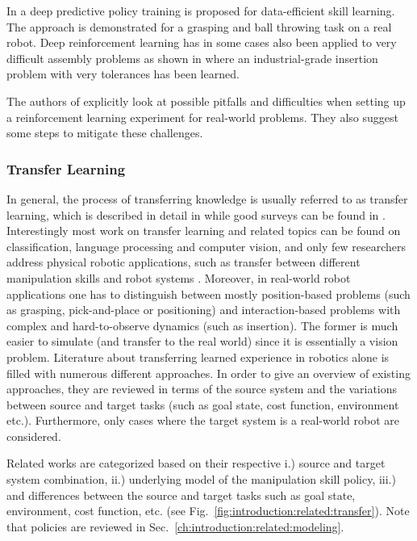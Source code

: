 In \cite{Ghadirzadeh.2017} a deep predictive policy training is proposed for data-efficient skill learning.
The approach is demonstrated for a grasping and ball throwing task on a real robot.
Deep reinforcement learning has in some cases also been applied to very difficult assembly problems as shown in \cite{Inoue.2017} where an industrial-grade insertion problem with very tolerances has been learned.

The authors of \cite{RupamMahmood.2018} explicitly look at possible pitfalls and difficulties when setting up a reinforcement learning experiment for real-world problems.
They also suggest some steps to mitigate these challenges.


\subsubsection{Transfer Learning}\label{ch:related:learning:transfer}

In general, the process of transferring knowledge is usually referred to as transfer learning, which is described in detail in \cite{Pan.2010,Weiss.2016} while good surveys can be found in \cite{Taylor.2009,Tan.2018,DaSilva.2019}.
Interestingly most work on transfer learning and related topics can be found on classification, language processing and computer vision, and only few researchers address physical robotic applications, such as transfer between different manipulation skills and robot systems \cite{Devin.2017}.
Moreover, in real-world robot applications one has to distinguish between mostly position-based problems (such as grasping, pick-and-place or positioning) and interaction-based problems with complex and hard-to-observe dynamics (such as insertion).
The former is much easier to simulate (and transfer to the real world) since it is essentially a vision problem.
Literature about transferring learned experience in robotics alone is filled with numerous different approaches.
In order to give an overview of existing approaches, they are reviewed in terms of the source system and the variations between source and target tasks (such as goal state, cost function, environment etc.).
Furthermore, only cases where the target system is a real-world robot are considered.

Related works are categorized based on their respective i.) source and target system combination, ii.) underlying model of the manipulation skill policy, iii.) and differences between the source and target tasks such as goal state, environment, cost function, etc. (see Fig.~\ref{fig:introduction:related:transfer}).
Note that policies are reviewed in Sec.~\ref{ch:introduction:related:modeling}.

